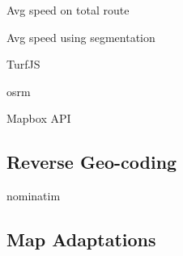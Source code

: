 Avg speed on total route

Avg speed using segmentation




TurfJS


osrm

Mapbox API





\subsection{Reverse Geo-coding}

nominatim



\subsection{Map Adaptations}

